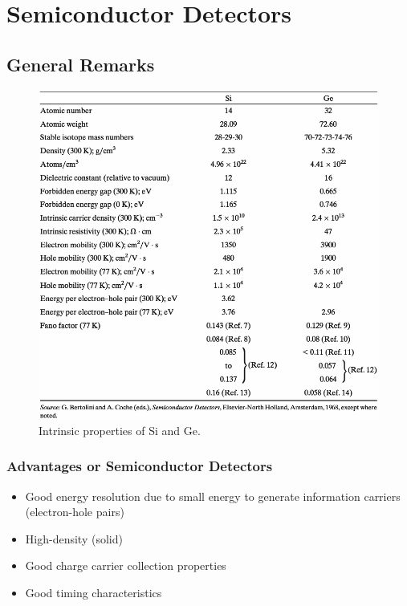 \section{Semiconductor Detectors}
\subsection{General Remarks}
\begin{figure}[ht]
    \centering
    \includegraphics[width=1.0\textwidth]{images/Si_Ge_properties.png}
    \caption{Intrinsic properties of Si and Ge.}
    \label{fig:Si_Ge_properties}
\end{figure}
\subsubsection{Advantages or Semiconductor Detectors}
\begin{itemize}
    \item Good energy resolution due to small energy to generate information carriers (electron-hole pairs)
    \item High-density (solid)
    \item Good charge carrier collection properties
    \item Good timing characteristics
\end{itemize}
